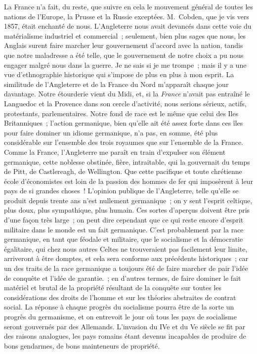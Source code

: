 \documentclass[french,twoside]{book} %
\begin{document}
La France n’a fait, du reste, que suivre en cela le mouvement général de toutes les nations de l’Europe, la Prusse et la Russie exceptées. M. Cobden, que je vis vers 1857, était enchanté de nous. L’Angleterre nous avait devancés dans cette voie du matérialisme industriel et commercial ; seulement, bien plus sages que nous, les Anglais surent faire marcher leur gouvernement d’accord avec la nation, tandis que notre maladresse a été telle, que le gouvernement de notre choix a pu nous engager malgré nous dans la guerre. Je ne sais si je me trompe ; mais il y a une vue d’ethnographie historique qui s’impose de plus en plus à mon esprit. La similitude de l’Angleterre et de la France du Nord m’apparaît chaque jour davantage. Notre étourderie vient du Midi, et, si la {\itshape France} n’avait pas entraîné le Languedoc et la Provence dans son cercle d’activité, nous serions sérieux, actifs, protestants, parlementaires. Notre fond de race est le même que celui des Iles Britanniques ; l’action germanique, bien qu’elle ait été assez forte dans ces îles pour faire dominer un idiome germanique, n’a pas, en somme, été plus considérable sur l’ensemble des trois royaumes que sur l’ensemble de la France. Comme la France, l’Angleterre me paraît en train d’expulser son élément germanique, cette noblesse obstinée, fière, intraitable, qui la gouvernait du temps de Pitt, de Castlereagh, de Wellington. Que cette pacifique et toute chrétienne école d’économistes est loin de la passion des hommes de fer qui imposèrent à leur pays de si grandes choses ! L’opinion publique de l’Angleterre, telle qu’elle se produit depuis trente ans n’est nullement germanique ; on y sent l’esprit celtique, plus doux, plus sympathique, plus humain. Ces sortes d’aperçus doivent être pris d’une façon très large ; on peut dire cependant que ce qui reste encore d’esprit militaire dans le monde est un fait germanique. C’est probablement par la race germanique, en tant que féodale et militaire, que le socialisme et la démocratie égalitaire, qui chez nous autres Celtes ne trouveraient pas facilement leur limite, arriveront à être domptes, et cela sera conforme aux précédents historiques ; car un des traits de la race germanique a toujours été de faire marcher de pair l’idée de conquête et l’idée de garantie. ; en d’autres termes, de faire dominer le fait matériel et brutal de la propriété résultant de la conquête sur toutes les considérations des droits de l’homme et sur les théories abstraites de contrat social. La réponse à chaque progrès du socialisme pourra être de la sorte un progrès du germanisme, et on entrevoit le jour où tous les pays de socialisme seront gouvernés par des Allemands. L’invasion du IVe et du Ve siècle se fit par des raisons analogues, les pays romains étant devenus incapables de produire de bons gendarmes, de bons mainteneurs de propriété.\par
\end{document}
